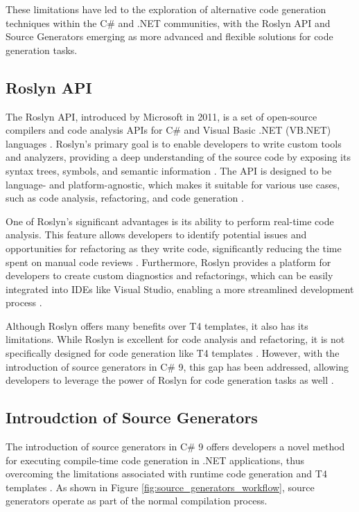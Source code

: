 These limitations have led to the exploration of alternative code generation techniques within the C\# and .NET communities, with the Roslyn API and Source Generators emerging as more advanced and flexible solutions for code generation tasks.

\subsection{Roslyn API}

The Roslyn API, introduced by Microsoft in 2011, is a set of open-source compilers and code analysis APIs for C\# and Visual Basic .NET (VB.NET) languages \cite{CSharpRoslyn}. Roslyn's primary goal is to enable developers to write custom tools and analyzers, providing a deep understanding of the source code by exposing its syntax trees, symbols, and semantic information \cite{Vermeir2022}. The API is designed to be language- and platform-agnostic, which makes it suitable for various use cases, such as code analysis, refactoring, and code generation \cite{Vermeir2022}.

One of Roslyn's significant advantages is its ability to perform real-time code analysis. This feature allows developers to identify potential issues and opportunities for refactoring as they write code, significantly reducing the time spent on manual code reviews \cite{Vermeir2022}. Furthermore, Roslyn provides a platform for developers to create custom diagnostics and refactorings, which can be easily integrated into IDEs like Visual Studio, enabling a more streamlined development process \cite{CSharpRoslyn}.

Although Roslyn offers many benefits over T4 templates, it also has its limitations. While Roslyn is excellent for code analysis and refactoring, it is not specifically designed for code generation like T4 templates \cite{Vermeir2022}. However, with the introduction of source generators in C\# 9, this gap has been addressed, allowing developers to leverage the power of Roslyn for code generation tasks as well \cite{Carter2020}.

\subsection{Introudction of Source Generators}

The introduction of source generators in C\# 9 offers developers a novel method for executing compile-time code generation in .NET applications, thus overcoming the limitations associated with runtime code generation and T4 templates \cite{Torgersen2020}. As shown in Figure \ref{fig:source_generators_workflow}, source generators operate as part of the normal compilation process.

